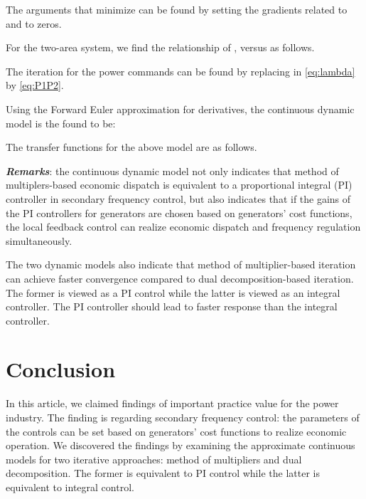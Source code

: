 \documentclass[10pt, journal, final, twocolumns]{IEEEtran}
\begin{document}
The arguments that minimize  can be found by setting the gradients related to  and  to zeros.



For the two-area system, we find the relationship of ,  versus  as follows.



The iteration for the power commands can be found by replacing  in \eqref{eq:lambda} by \eqref{eq:P1P2}.


Using the Forward Euler approximation for derivatives, the continuous dynamic model is the found to be:


The transfer functions for the above model are as follows.


\emph{\textbf{Remarks}}: the continuous dynamic model not only indicates that method of multiplers-based economic dispatch is equivalent to a proportional integral (PI) controller in secondary frequency control, but also indicates that if the gains of the PI controllers for generators are chosen based on generators' cost functions, the local feedback control can realize economic dispatch and frequency regulation simultaneously.

The two dynamic models also indicate that method of multiplier-based iteration can achieve faster convergence compared to dual decomposition-based iteration. The former is viewed as a PI control while the latter is viewed as an integral controller. The PI controller should lead to faster response than the integral controller.





\section{Conclusion}
In this article, we claimed findings of important practice value for the power industry. The finding is regarding secondary frequency control: the parameters of the controls can be set based on generators' cost functions to realize economic operation.
We discovered the findings by examining the approximate continuous models for two iterative approaches: method of multipliers and dual decomposition. The former is equivalent to PI control while the latter is equivalent to integral control.
\end{document}
